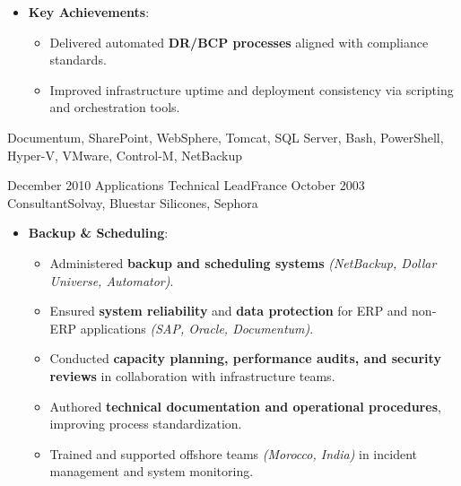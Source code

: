 \begin{experiences}
{\begin{itemize}[left=0pt,label={},itemsep=0.4em]
          \item \textbf{Key Achievements}:
            \begin{itemize}[itemsep=0.2em,topsep=0.2em,parsep=0pt]
              \small
              \item Delivered automated \textbf{DR/BCP processes} aligned with compliance standards.
              \item Improved infrastructure uptime and deployment consistency via scripting and orchestration tools.
            \end{itemize}
        \end{itemize}
       \vspace{0.5em}  %
    }
    {Documentum, SharePoint, WebSphere, Tomcat, SQL Server, Bash, PowerShell, Hyper-V, VMware, Control-M, NetBackup}

\emptySeparator

\consultantexperience
    {December 2010} {Applications Technical Lead}{}{France}
    {October 2003}    {Consultant}{Solvay, Bluestar Silicones, Sephora} {
        \begin{itemize}[left=0pt,label={},itemsep=0.5em]
        \vspace{0.5em}  %
          \item \textbf{Backup \& Scheduling}:
            \begin{itemize}[itemsep=0.2em,topsep=0.2em,parsep=0pt]
              \small
              \item Administered \textbf{backup and scheduling systems} \emph{(NetBackup, Dollar Universe, Automator)}.
              \item Ensured \textbf{system reliability} and \textbf{data protection} for ERP and non-ERP applications \emph{(SAP, Oracle, Documentum)}.
              \item Conducted \textbf{capacity planning, performance audits, and security reviews} in collaboration with infrastructure teams.
              \item Authored \textbf{technical documentation and operational procedures}, improving process standardization.
              \item Trained and supported offshore teams \emph{(Morocco, India)} in incident management and system monitoring.
            \end{itemize}


\end{itemize}}
\end{experiences}
